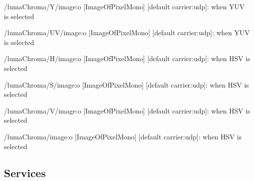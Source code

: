 \begin{DoxyItemize}
\item /luma\+Chroma/\+Y/image\+:o \mbox{[}Image\+Of\+Pixel\+Mono\mbox{]} \mbox{[}default carrier\+:udp\mbox{]}\+: when Y\+UV is selected
\item /luma\+Chroma/\+U\+V/image\+:o \mbox{[}Image\+Of\+Pixel\+Mono\mbox{]} \mbox{[}default carrier\+:udp\mbox{]}\+: when Y\+UV is selected
\item /luma\+Chroma/\+H/image\+:o \mbox{[}Image\+Of\+Pixel\+Mono\mbox{]} \mbox{[}default carrier\+:udp\mbox{]}\+: when H\+SV is selected
\item /luma\+Chroma/\+S/image\+:o \mbox{[}Image\+Of\+Pixel\+Mono\mbox{]} \mbox{[}default carrier\+:udp\mbox{]}\+: when H\+SV is selected
\item /luma\+Chroma/\+V/image\+:o \mbox{[}Image\+Of\+Pixel\+Mono\mbox{]} \mbox{[}default carrier\+:udp\mbox{]}\+: when H\+SV is selected
\item /luma\+Chroma/image\+:o \mbox{[}Image\+Of\+Pixel\+Mono\mbox{]} \mbox{[}default carrier\+:udp\mbox{]}\+: when H\+SV is selected
\end{DoxyItemize}\hypertarget{group__seg2cloud_services_sec}{}\subsection{Services}\label{group__seg2cloud_services_sec}
